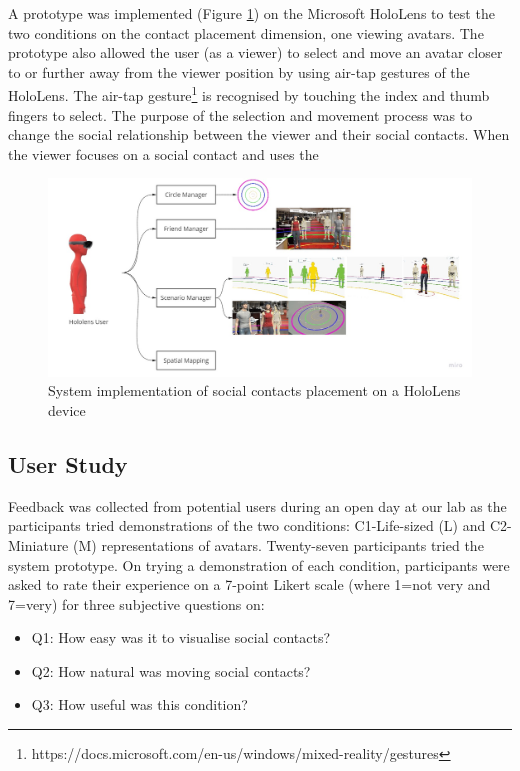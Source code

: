 A prototype was implemented (Figure \ref{fig:placement:system}) on the Microsoft HoloLens to test the two conditions on the contact placement dimension, one viewing avatars. The prototype also allowed the user (as a viewer) to select and move an avatar closer to or further away from the viewer position by using air-tap gestures of the HoloLens. The air-tap gesture\footnote{https://docs.microsoft.com/en-us/windows/mixed-reality/gestures} is recognised by touching the index and thumb fingers to select. The purpose of the selection and movement process was to change the social relationship between the viewer and their social contacts. When the viewer focuses on a social contact and uses the 

\begin{figure}[ht]
    \centering
    \includegraphics[width=\linewidth]{images/42-placement-ismar17/placement-system.jpg}   
    \caption{System implementation of social contacts placement on a HoloLens device} 
    \label{fig:placement:system}
\end{figure}


\subsection{User Study}

Feedback was collected from potential users during an open day at our lab as the participants tried demonstrations of the two conditions: C1-Life-sized (L) and C2-Miniature (M) representations of avatars. Twenty-seven participants tried the system prototype. On trying a demonstration of each condition, participants were asked to rate their experience on a 7-point Likert scale (where 1=not very and 7=very) for three subjective questions on: 

\begin{itemize}
    \item Q1: How easy was it to visualise social contacts?
    \item Q2: How natural was moving social contacts?
    \item Q3: How useful was this condition?
\end{itemize}

